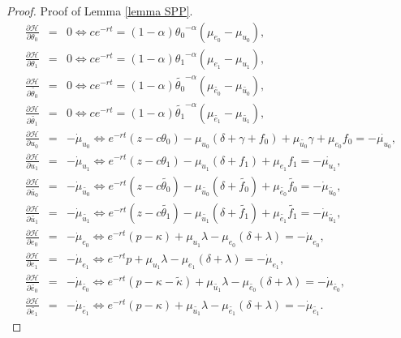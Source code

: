 \documentclass[12pt]{article} %
\theoremstyle{definition}
\begin{document}
\begin{appendix}
\begin{proof}{Proof of Lemma \ref{lemma SPP}.}
\begin{eqnarray}
    \frac{\partial \mathcal{H}}{\partial \theta_0} &=& 0 \iff ce^{-rt}=(1-\alpha){\theta_0}^{-\alpha} (\mu_{e_0}-\mu_{u_0}), \label{foc1} \\
    \frac{\partial \mathcal{H}}{\partial \theta_1} &=& 0 \iff ce^{-rt}=(1-\alpha){\theta_1}^{-\alpha} (\mu_{e_1}-\mu_{u_1}), \label{foc2}\\
     \frac{\partial \mathcal{H}}{\partial \tilde{\theta_0}} &=& 0 \iff ce^{-rt}=(1-\alpha){\tilde{\theta_0}}^{-\alpha} (\mu_{\tilde{e_0}}-\mu_{\tilde{u_0}}), \label{foc3}\\
      \frac{\partial \mathcal{H}}{\partial \tilde{\theta_1}} &=& 0 \iff ce^{-rt}=(1-\alpha){\tilde{\theta_1}}^{-\alpha} (\mu_{\tilde{e_1}}-\mu_{\tilde{u_1}}), \label{foc4}\\
      \frac{\partial \mathcal{H}}{\partial u_0} &=& -\dot{\mu}_{u_0} \iff e^{-rt}(z-c\theta_0)-\mu_{u_0}(\delta+\gamma+f_0)+\mu_{\tilde{u_0}}\gamma + \mu_{e_0}f_0= -\dot{\mu_{u_0}}, \label{foc5}\\
       \frac{\partial \mathcal{H}}{\partial u_1} &=& -\dot{\mu}_{u_1} \iff e^{-rt}(z-c\theta_1)-\mu_{u_1}(\delta+f_1) + \mu_{e_1}f_1 = -\dot{\mu_{u_1}}, \label{foc6}\\
       \frac{\partial \mathcal{H}}{\partial \tilde{u_0}} &=& -\dot{\mu}_{\tilde{u_0}} \iff e^{-rt}(z-c\tilde{\theta_0})-\mu_{\tilde{u_0}}(\delta+\tilde{f_0}) + \mu_{\tilde{e_0}}\tilde{f_0} = -\dot{\mu}_{\tilde{u_0}}, \label{foc7}\\
      \frac{\partial \mathcal{H}}{\partial \tilde{u_1}} &=& -\dot{\mu}_{\tilde{u_1}} \iff e^{-rt}(z-c\tilde{\theta_1})-\mu_{\tilde{u_1}}(\delta+\tilde{f_1}) + \mu_{\tilde{e_1}}\tilde{f_1} = -\dot{\mu}_{\tilde{u_1}}, \label{foc8}\\ 
      \frac{\partial \mathcal{H}}{\partial e_0}  &=& -\dot{\mu}_{e_0} \iff e^{-rt}(p-\kappa)+\mu_{u_1} \lambda -\mu_{e_0}(\delta + \lambda) = -\dot{\mu}_{e_0}, \label{foc9}\\
       \frac{\partial \mathcal{H}}{\partial e_1}  &=& -\dot{\mu}_{e_1} \iff e^{-rt}p+\mu_{u_1} \lambda -\mu_{e_1}(\delta + \lambda) = -\dot{\mu}_{e_1}, \label{foc10}\\
        \frac{\partial \mathcal{H}}{\partial \tilde{e_0}}  &=& -\dot{\mu}_{\tilde{e_0}} \iff e^{-rt}(p-\kappa-\tilde{\kappa})+\mu_{\tilde{u_1}} \lambda -\mu_{\tilde{e_0}}(\delta + \lambda) = -\dot{\mu}_{\tilde{e_0}}, \label{foc11}\\
         \frac{\partial \mathcal{H}}{\partial \tilde{e_1}}  &=& -\dot{\mu}_{\tilde{e_1}} \iff e^{-rt}(p-\kappa)+\mu_{\tilde{u_1}} \lambda -\mu_{\tilde{e_1}}(\delta + \lambda) = -\dot{\mu}_{\tilde{e_1}}. \label{foc12}

\end{eqnarray}
\end{proof}
\end{appendix}
\end{document}
